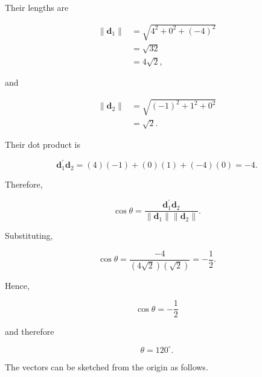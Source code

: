 \documentclass{article}
\begin{document}
Their lengths are

\[
\begin{aligned}
\|\mathbf d_1\|
&=
\sqrt{4^2+0^2+(-4)^2}\\
&=
\sqrt{32}\\
&=
\boxed{4\sqrt{2}},
\end{aligned}
\]

and

\[
\begin{aligned}
\|\mathbf d_2\|
&=
\sqrt{(-1)^2+1^2+0^2}\\
&=
\boxed{\sqrt{2}}.
\end{aligned}
\]

Their dot product is

\[
\mathbf d_1^\prime\mathbf d_2
=
(4)(-1)+(0)(1)+(-4)(0)
=
-4.
\]

Therefore,

\[
\cos\theta
=
\frac{
\mathbf d_1^\prime\mathbf d_2
}{
\|\mathbf d_1\|\|\mathbf d_2\|
}.
\]

Substituting,

\[
\cos\theta
=
\frac{-4}
{(4\sqrt{2})(\sqrt{2})}
=
-\frac12.
\]

Hence,

\[
\boxed{\cos\theta=-\frac12}
\]

and therefore

\[
\boxed{\theta=120^\circ}.
\]

The vectors can be sketched from the origin as follows.

\begin{center}



\end{center}
\end{document}
